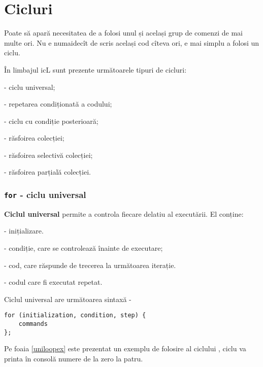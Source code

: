 \section{Cicluri}

Poate să apară necesitatea de a folosi unul și același grup de comenzi de mai multe ori. Nu e numaidecît de scris același cod cîteva ori, e mai simplu a folosi un ciclu.

În limbajul icL sunt prezente următoarele tipuri de cicluri:

\begin{icItems}
\item
	 - ciclu universal;
\item
	 - repetarea condiționată a codului;
\item
	 - ciclu cu condiție posterioară;
\item
	 - răsfoirea colecției;
\item
	 - răsfoirea selectivă colecției;
\item
	 - răsfoirea parțială colecției.
\end{icItems}


\subsubsection{\lstinline`for` - ciclu universal}

{\bf Ciclul universal} permite a controla fiecare delatiu al executării. El conține:

\begin{icItems}
\item
	 - inițializare.
\item
	 - condiție, care se controlează înainte de executare;
\item
	 - cod, care răspunde de trecerea la următoarea iterație.
\item
	 - codul care fi executat repetat.
\end{icItems}

Ciclul universal are următoarea sintaxă -
\begin{lstlisting}[numbers=none]
for (initialization, condition, step) {
	commands
};
\end{lstlisting}

Pe foaia \ref{uniloopex} este prezentat un exemplu de folosire al ciclului , ciclu va printa în consolă numere de la zero la patru.

